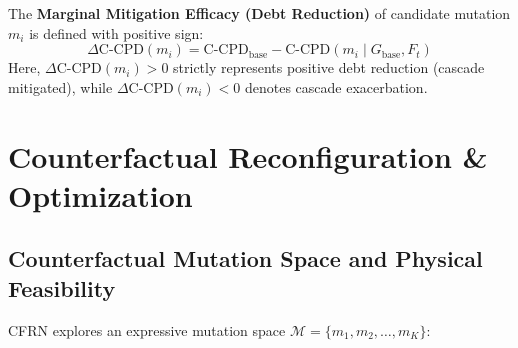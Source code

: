 \documentclass[pdflatex,sn-mathphys-num]{sn-jnl}
\theoremstyle{thmstyleone}
\theoremstyle{thmstyletwo}
\theoremstyle{thmstylethree}
\begin{document}
The \textbf{Marginal Mitigation Efficacy (Debt Reduction)} of candidate mutation $m_i$ is defined with positive sign:
\begin{equation}
\Delta \mathrm{C\text{-}CPD}(m_i) = \mathrm{C\text{-}CPD}_{\mathrm{base}} - \mathrm{C\text{-}CPD}(m_i \mid G_{\mathrm{base}}, F_t)
\end{equation}
Here, $\Delta \mathrm{C\text{-}CPD}(m_i) > 0$ strictly represents positive debt reduction (cascade mitigated), while $\Delta \mathrm{C\text{-}CPD}(m_i) < 0$ denotes cascade exacerbation.

\section{Counterfactual Reconfiguration \& Optimization}\label{sec5}

\subsection{Counterfactual Mutation Space and Physical Feasibility}
CFRN explores an expressive mutation space $\mathcal{M} = \{m_1, m_2, \dots, m_K\}$:
\end{document}
